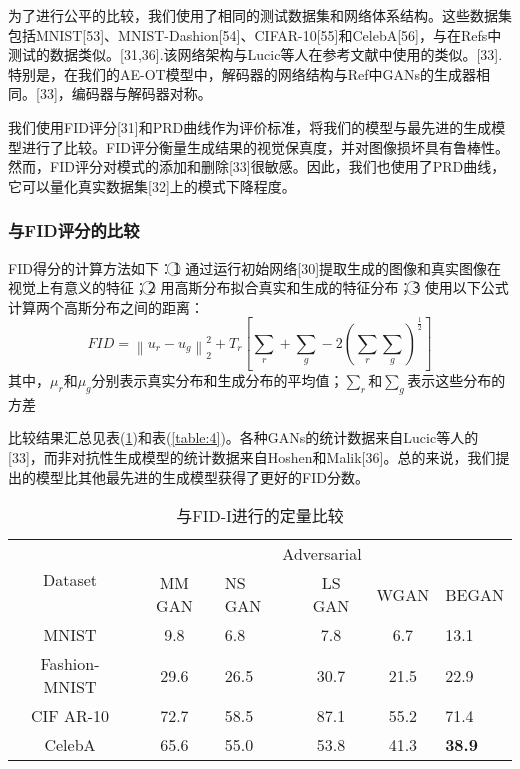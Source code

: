 为了进行公平的比较，我们使用了相同的测试数据集和网络体系结构。这些数据集包括MNIST[53]、MNIST-Dashion[54]、CIFAR-10[55]和CelebA[56]，与在Refs中测试的数据类似。[31,36].该网络架构与Lucic等人在参考文献中使用的类似。[33].特别是，在我们的AE-OT模型中，解码器的网络结构与Ref中GANs的生成器相同。[33]，编码器与解码器对称。

我们使用FID评分[31]和PRD曲线作为评价标准，将我们的模型与最先进的生成模型进行了比较。FID评分衡量生成结果的视觉保真度，并对图像损坏具有鲁棒性。然而，FID评分对模式的添加和删除[33]很敏感。因此，我们也使用了PRD曲线，它可以量化真实数据集[32]上的模式下降程度。

\subsubsection{与FID评分的比较}

FID得分的计算方法如下：\textcircled{1} 通过运行初始网络[30]提取生成的图像和真实图像在视觉上有意义的特征；\textcircled{2} 用高斯分布拟合真实和生成的特征分布；\textcircled{3} 使用以下公式计算两个高斯分布之间的距离：
\begin{equation}
	FID = \left \| u_r - u_g \right \|_2^2 + T_r \left [ \sum_r + \sum_g - 2\left ( \sum_r \sum_g \right )^{\frac{1}{2} }  \right ] 
	\label{function:34}
\end{equation}
其中，$\mu _r$和$\mu _g$分别表示真实分布和生成分布的平均值；$\sum _r$和$\sum _g$表示这些分布的方差

比较结果汇总见表(\ref{table:3})和表(\ref{table:4})。各种GANs的统计数据来自Lucic等人的[33]，而非对抗性生成模型的统计数据来自Hoshen和Malik[36]。总的来说，我们提出的模型比其他最先进的生成模型获得了更好的FID分数。
\begin{table}[!htbp]
	\caption{与FID-I进行的定量比较}
	\label{table:3}
	\centering
	\begin{tabular}{@{}cclccl@{}}
		\toprule
		\multirow{2}{*}{Dataset} & \multicolumn{5}{c}{Adversarial}                 \\ \cmidrule(l){2-6} 
		& MM GAN & NS GAN & LS GAN & WGAN & BEGAN         \\ \cmidrule(r){1-6}
		MNIST                    & 9.8    & 6.8    & 7.8    & 6.7  & 13.1          \\
		Fashion-MNIST            & 29.6   & 26.5   & 30.7   & 21.5 & 22.9          \\
		CIF AR-10                & 72.7   & 58.5   & 87.1   & 55.2 & 71.4          \\
		CelebA                   & 65.6   & 55.0   & 53.8   & 41.3 & \textbf{38.9} \\ \bottomrule
	\end{tabular}
\end{table}

